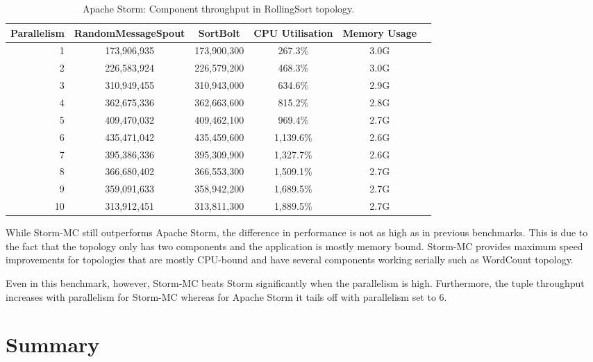 \documentclass[bsc,deptreport,twoside,singlespacing,normalheadings,parskip]{infthesis}\usepackage[]{graphicx}\usepackage[]{color}
\begin{document}
\begin{table}[!htb]
\begin{adjustwidth}{-0.5in}{-0.5in}
\centering
\small
\begin{tabular}{@{}rccccl@{}}
    \textbf{Parallelism} & \textbf{RandomMessageSpout} & \textbf{SortBolt} & \textbf{CPU Utilisation} & \textbf{Memory Usage} \\ \toprule
    1 & {173,906,935} & {173,900,300} & {267.3\%} & {3.0G} \\
    2 & {226,583,924} & {226,579,200} & {468.3\%} & {3.0G} \\
    3 & {310,949,455} & {310,943,000} & {634.6\%} & {2.9G} \\
    4 & {362,675,336} & {362,663,600} & {815.2\%} & {2.8G} \\
    5 & {409,470,032} & {409,462,100} & {969.4\%} & {2.7G} \\
    6 & {435,471,042} & {435,459,600} & {1,139.6\%} & {2.6G} \\
    7 & {395,386,336} & {395,309,900} & {1,327.7\%} & {2.6G} \\
    8 & {366,680,402} & {366,553,300} & {1,509.1\%} & {2.7G} \\
    9 & {359,091,633} & {358,942,200} & {1,689.5\%} & {2.7G} \\
    10 & {313,912,451} & {313,811,300} & {1,889.5\%} & {2.7G} \\
\end{tabular}
\caption{Apache Storm: Component throughput in RollingSort topology.}
\label{table:storm_rolling}
\end{adjustwidth}
\end{table}

While Storm-MC still outperforms Apache Storm, the difference in performance is not as high as in previous benchmarks. This is due to the fact that the topology only has two components and the application is mostly memory bound. Storm-MC provides maximum speed improvements for topologies that are mostly CPU-bound and have several components working serially such as WordCount topology.

Even in this benchmark, however, Storm-MC beats Storm significantly when the parallelism is high. Furthermore, the tuple throughput increases with parallelism for Storm-MC whereas for Apache Storm it tails off with parallelism set to 6.

\section{Summary}
\end{document}
